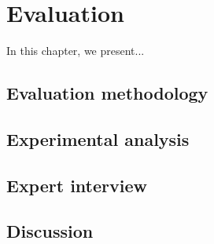 \chapter[Evaluation]{Evaluation}
\label{Chap:ch5}
\pagestyle{headings}

In this chapter, we present...

\section{Evaluation methodology}



\section{Experimental analysis}

 

\section{Expert interview}


\section{Discussion}

